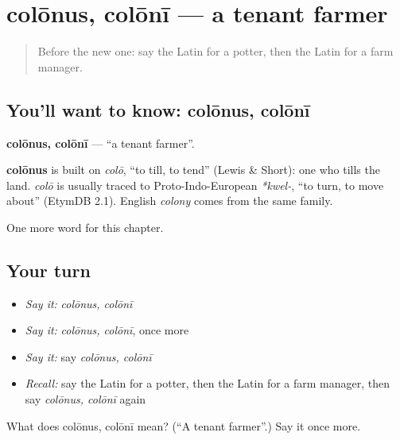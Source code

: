 \section[colōnus, colōnī]{colōnus, colōnī — a tenant farmer}

\label{lesson:LA-C188-colonus}



\begin{quote}
Before the new one: say the Latin for a potter, then the Latin for a farm manager.
\end{quote}

\subsection*{You'll want to know: colōnus, colōnī}
\textbf{colōnus, colōnī} — \textquotedblleft{}a tenant farmer\textquotedblright{}.

\begin{cousinweb}
\textbf{colōnus} is built on \emph{colō}, \textquotedblleft{}to till, to tend\textquotedblright{} (Lewis \& Short): one who tills the land. \emph{colō} is usually traced to Proto-Indo-European \emph{*kwel-}, \textquotedblleft{}to turn, to move about\textquotedblright{} (EtymDB 2.1). English \emph{colony} comes from the same family.
\end{cousinweb}

\begin{grammarlens}[title={What you've built}]
One more word for this chapter.
\end{grammarlens}

\subsection*{Your turn}
\begin{itemize}
\raggedright
  \item \emph{Say it:} \emph{colōnus, colōnī}
  \item \emph{Say it:} \emph{colōnus, colōnī}, once more
  \item \emph{Say it:} say \emph{colōnus, colōnī}
  \item \emph{Recall:} say the Latin for a potter, then the Latin for a farm manager, then say \emph{colōnus, colōnī} again
\end{itemize}

\begin{tcolorbox}[breakable,colback=teal!4,colframe=teal!35!black,title={Before you move on}]
What does colōnus, colōnī mean? (\textquotedblleft{}A tenant farmer\textquotedblright{}.) Say it once more.
\end{tcolorbox}
